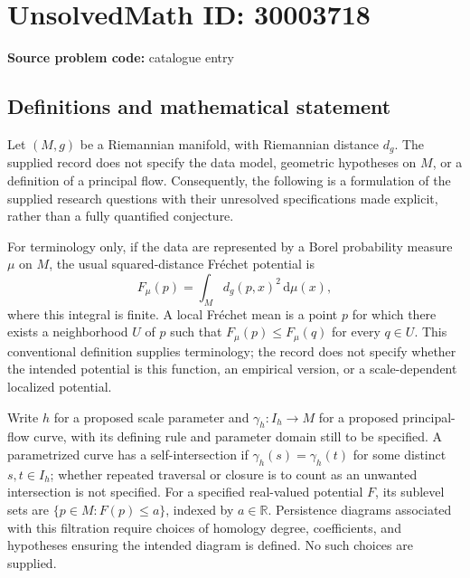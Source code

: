 \documentclass[11pt]{article}
\newcommand{\R}{\mathbb{R}}
\begin{document}
\section*{UnsolvedMath ID: 30003718}
\textbf{Source problem code:} catalogue entry
\subsection{Definitions and mathematical statement}
Let \((M,g)\) be a Riemannian manifold, with Riemannian distance \(d_g\). The supplied record does not specify the data model, geometric hypotheses on \(M\), or a definition of a principal flow. Consequently, the following is a formulation of the supplied research questions with their unresolved specifications made explicit, rather than a fully quantified conjecture.

For terminology only, if the data are represented by a Borel probability measure \(\mu\) on \(M\), the usual squared-distance Fr\'echet potential is
\[
F_\mu(p)=\int_M d_g(p,x)^2\,\mathrm{d}\mu(x),
\]
where this integral is finite. A local Fr\'echet mean is a point \(p\) for which there exists a neighborhood \(U\) of \(p\) such that \(F_\mu(p)\leq F_\mu(q)\) for every \(q\in U\). This conventional definition supplies terminology; the record does not specify whether the intended potential is this function, an empirical version, or a scale-dependent localized potential.

Write \(h\) for a proposed scale parameter and \(\gamma_h:I_h\to M\) for a proposed principal-flow curve, with its defining rule and parameter domain still to be specified. A parametrized curve has a self-intersection if \(\gamma_h(s)=\gamma_h(t)\) for some distinct \(s,t\in I_h\); whether repeated traversal or closure is to count as an unwanted intersection is not specified. For a specified real-valued potential \(F\), its sublevel sets are \(\{p\in M:F(p)\leq a\}\), indexed by \(a\in\R\). Persistence diagrams associated with this filtration require choices of homology degree, coefficients, and hypotheses ensuring the intended diagram is defined. No such choices are supplied.
\end{document}
